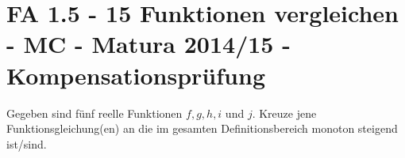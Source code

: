 \section{FA 1.5 - 15 Funktionen vergleichen - MC - Matura 2014/15 - Kompensationsprüfung}

\begin{beispiel}[FA 1.5]{1} %
				Gegeben sind fünf reelle Funktionen $f,g,h,i$ und $j$. Kreuze jene Funktionsgleichung(en) an die im gesamten Definitionsbereich monoton steigend ist/sind.
				
\end{beispiel}